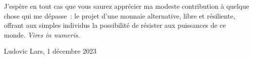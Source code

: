 J'espère en tout cas que vous saurez apprécier ma modeste contribution à quelque chose qui me dépasse~: le projet d'une monnaie alternative, libre et résiliente, offrant aux simples individus la possibilité de résister aux puissances de ce monde. \emph{Vires in numeris}.

\begin{flushright}Ludovic Lars, 1\ier{} décembre 2023\end{flushright}

%
%
%
%
